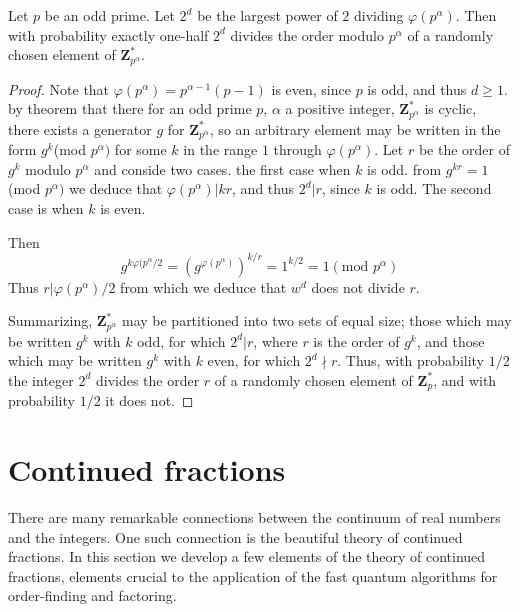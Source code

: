 \begin{lemma}
    Let $p$ be an odd prime. Let $2^d$ be the largest power of $2$ dividing $\varphi(p^{\alpha})$. Then with probability exactly one-half $2^d$ divides the order modulo $p^{\alpha}$ of a randomly chosen element of $\mathbf{Z}_{p^{\alpha}}^*$.
\end{lemma}
\begin{proof}
    Note that $\varphi(p^\alpha)=p^{\alpha-1}(p-1)$ is even, since $p$ is odd, and thus $d \geq 1$. by theorem that there for an odd prime $p$, $\alpha$ a positive integer, $\mathbf{Z}_{p^{\alpha}}^*$ is cyclic, there exists a generator $g$ for $\mathbf{Z}_{p^{\alpha}}^*$, so an arbitrary element may be written in the form $g^k$(mod $p^{\alpha})$ for some $k$ in the range $1$ through $\varphi(p^{\alpha})$. Let $r$ be the order of $g^k$ modulo $p^{\alpha}$ and conside two cases. the first case when $k$ is odd. from $g^{kr}=1$(mod $p^{\alpha})$ we deduce that $\varphi(p^{\alpha})|kr$, and thus $2^d|r$, since $k$ is odd. The second case is when $k$ is even.

    Then
    \[
    g^{k\varphi(p^{\alpha}/2}=(g^{\varphi(p^{\alpha})})^{k/r}=1^{k/2}=1(\text{mod }p^{\alpha})
    \]
    Thus $r|\varphi(p^{\alpha})/2$ from which we deduce that $w^d$ does not divide $r$.

    Summarizing, $\mathbf{Z}_{p^{\alpha}}^*$ may be partitioned into two sets of equal size; those which may be written $g^k$ with $k$ odd, for which $2^d|r$, where $r$ is the order of $g^k$, and those which may be written $g^k$ with $k$ even, for which $2^d \nmid r$. Thus, with probability $1/2$ the integer $2^d$ divides the order $r$ of a randomly chosen element of $\mathbf{Z}_p^{*}$, and with probability $1/2$ it does not.
\end{proof}

\section{Continued fractions}
There are many remarkable connections between the continuum of real numbers and the integers. One such connection is the beautiful theory of continued fractions. In this section we develop a few elements  of the theory of continued fractions, elements crucial to the application of the fast quantum algorithms for order-finding and factoring.


